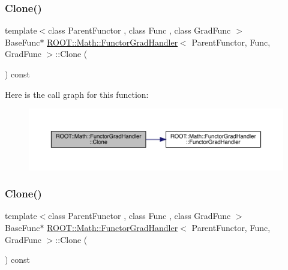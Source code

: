 \subsubsection{\texorpdfstring{Clone()}{Clone()}\hspace{0.1cm}{\footnotesize\ttfamily [2/3]}}
{\footnotesize\ttfamily template$<$class Parent\+Functor , class Func , class Grad\+Func $>$ \\
Base\+Func$\ast$ \mbox{\hyperlink{classROOT_1_1Math_1_1FunctorGradHandler}{R\+O\+O\+T\+::\+Math\+::\+Functor\+Grad\+Handler}}$<$ Parent\+Functor, Func, Grad\+Func $>$\+::Clone (\begin{DoxyParamCaption}{ }\end{DoxyParamCaption}) const\hspace{0.3cm}{\ttfamily [inline]}}

Here is the call graph for this function\+:
\nopagebreak
\begin{figure}[H]
\begin{center}
\leavevmode
\includegraphics[width=350pt]{df/df5/classROOT_1_1Math_1_1FunctorGradHandler_a20e9b0e519dc524cdf964912cf63083e_cgraph}
\end{center}
\end{figure}
\mbox{\label{classROOT_1_1Math_1_1FunctorGradHandler_a20e9b0e519dc524cdf964912cf63083e}} 
\subsubsection{\texorpdfstring{Clone()}{Clone()}\hspace{0.1cm}{\footnotesize\ttfamily [3/3]}}
{\footnotesize\ttfamily template$<$class Parent\+Functor , class Func , class Grad\+Func $>$ \\
Base\+Func$\ast$ \mbox{\hyperlink{classROOT_1_1Math_1_1FunctorGradHandler}{R\+O\+O\+T\+::\+Math\+::\+Functor\+Grad\+Handler}}$<$ Parent\+Functor, Func, Grad\+Func $>$\+::Clone (\begin{DoxyParamCaption}{ }\end{DoxyParamCaption}) const\hspace{0.3cm}{\ttfamily [inline]}}

